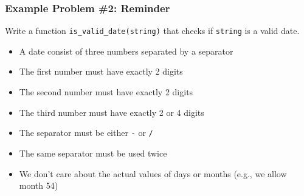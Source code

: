 \begin{frame}
  \frametitle{Example Problem \#2: Reminder}
  \begin{center}
    Write a function \texttt{is\_valid\_date(string)} that checks if \texttt{string} is a valid date.
  \end{center}
  \vskip5mm
  \begin{itemize}
    \item A date consist of three numbers separated by a separator
    \item The first number must have exactly 2 digits
    \item The second number must have exactly 2 digits
    \item The third number must have exactly 2 or 4 digits
    \item The separator must be either \texttt{-} or \texttt{/}
    \item The same separator must be used twice
    \item We don't care about the actual values of days or months (e.g., we allow month 54)
  \end{itemize}
\end{frame}

